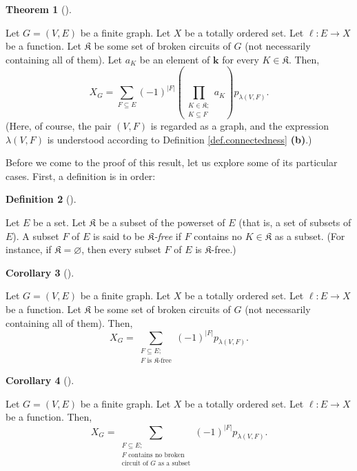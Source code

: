 \documentclass[numbers=enddot,12pt,final,onecolumn,notitlepage]{scrartcl}%
\theoremstyle{definition}
\newtheorem{theo}{Theorem}[section]
\newenvironment{theorem}[1][]
{\begin{theo}[#1]\begin{leftbar}}
{\end{leftbar}\end{theo}}
\newtheorem{defi}[theo]{Definition}
\newenvironment{definition}[1][]
{\begin{defi}[#1]\begin{leftbar}}
{\end{leftbar}\end{defi}}
\newtheorem{coro}[theo]{Corollary}
\newenvironment{corollary}[1][]
{\begin{coro}[#1]\begin{leftbar}}
{\end{leftbar}\end{coro}}
\let\sumnonlimits\sum
\let\prodnonlimits\prod
\renewcommand{\sum}{\sumnonlimits\limits}
\renewcommand{\prod}{\prodnonlimits\limits}
\begin{document}
\begin{theorem}
\label{thm.chromsym.varis}Let $G=\left(  V,E\right)  $ be a finite graph. Let
$X$ be a totally ordered set. Let $\ell:E\rightarrow X$ be a function. Let
$\mathfrak{K}$ be some set of broken circuits of $G$ (not necessarily
containing all of them). Let $a_{K}$ be an element of $\mathbf{k}$ for every
$K\in\mathfrak{K}$. Then,%
\[
X_{G}=\sum_{F\subseteq E}\left(  -1\right)  ^{\left\vert F\right\vert }\left(
\prod_{\substack{K\in\mathfrak{K};\\K\subseteq F}}a_{K}\right)  p_{\lambda
\left(  V,F\right)  }.
\]
(Here, of course, the pair $\left(  V,F\right)  $ is regarded as a graph, and
the expression $\lambda\left(  V,F\right)  $ is understood according to
Definition \ref{def.connectedness} \textbf{(b)}.)
\end{theorem}

Before we come to the proof of this result, let us explore some of its
particular cases. First, a definition is in order:

\begin{definition}
\label{def.K-free}Let $E$ be a set. Let $\mathfrak{K}$ be a subset of the
powerset of $E$ (that is, a set of subsets of $E$). A subset $F$ of $E$ is
said to be $\mathfrak{K}$\textit{-free} if $F$ contains no $K\in\mathfrak{K}$
as a subset. (For instance, if $\mathfrak{K}=\varnothing$, then every subset
$F$ of $E$ is $\mathfrak{K}$-free.)
\end{definition}

\begin{corollary}
\label{cor.chromsym.K-free}Let $G=\left(  V,E\right)  $ be a finite graph. Let
$X$ be a totally ordered set. Let $\ell:E\rightarrow X$ be a function. Let
$\mathfrak{K}$ be some set of broken circuits of $G$ (not necessarily
containing all of them). Then,%
\[
X_{G}=\sum_{\substack{F\subseteq E;\\F\text{ is }\mathfrak{K}\text{-free}%
}}\left(  -1\right)  ^{\left\vert F\right\vert }p_{\lambda\left(  V,F\right)
}.
\]

\end{corollary}

\begin{corollary}
\label{cor.chromsym.NBC}Let $G=\left(  V,E\right)  $ be a finite graph. Let
$X$ be a totally ordered set. Let $\ell:E\rightarrow X$ be a function. Then,%
\[
X_{G}=\sum_{\substack{F\subseteq E;\\F\text{ contains no broken}%
\\\text{circuit of }G\text{ as a subset}}}\left(  -1\right)  ^{\left\vert
F\right\vert }p_{\lambda\left(  V,F\right)  }.
\]

\end{corollary}
\end{document}
